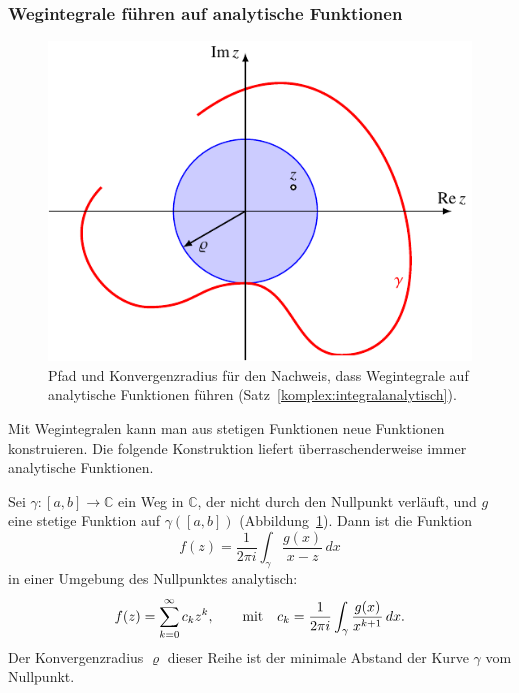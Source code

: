 \subsubsection{Wegintegrale führen auf analytische Funktionen}
\begin{figure}
\centering
\includegraphics{chapters/080-funktionentheorie/images/integralanalytisch.pdf}
\caption{Pfad und Konvergenzradius für den Nachweis, dass Wegintegrale
auf analytische Funktionen führen (Satz~\ref{komplex:integralanalytisch}).
\label{komplex:integralanalytischpfad}}
\end{figure}
Mit Wegintegralen kann man aus stetigen Funktionen neue Funktionen
konstruieren.
Die folgende Konstruktion liefert überraschenderweise immer
analytische Funktionen.
\begin{satz}
\label{komplex:integralanalytisch}
Sei $\gamma\colon [a,b]\to\mathbb C$ ein Weg in $\mathbb C$, der nicht
durch den Nullpunkt verläuft, und $g$ eine stetige Funktion
auf $\gamma([a,b])$ (Abbildung~\ref{komplex:integralanalytischpfad}).
Dann ist die Funktion
\[
f(z) = \frac1{2\pi i}\int_\gamma \frac{g(x)}{x-z}\,dx
\]
in einer Umgebung des Nullpunktes analytisch:
\[
f(z) = \sum_{k=0}^\infty c_k z^k,\qquad
\text{mit\quad}
c_k=\frac1{2\pi i}\int_\gamma \frac{g(x)}{x^{k+1}}\,dx.
\]
Der Konvergenzradius $\varrho$ dieser Reihe ist der minimale Abstand der
Kurve $\gamma$ vom Nullpunkt.
\end{satz}

